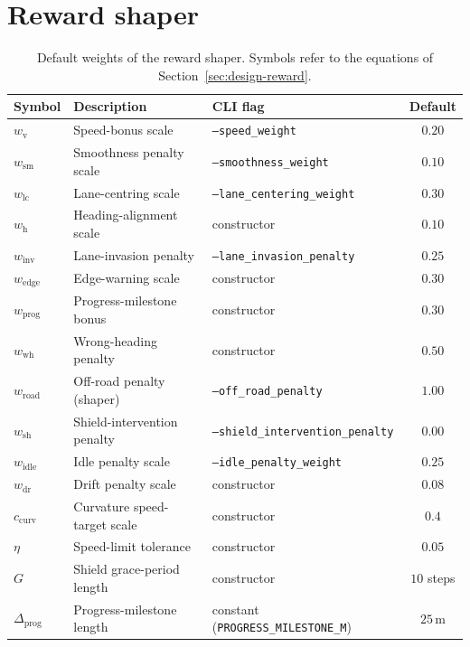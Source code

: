 \section{Reward shaper}\label{app:hp-reward}

\begin{table}[H]
  \centering
  \caption{Default weights of the reward shaper. Symbols refer to the equations of
           Section~\ref{sec:design-reward}.}
  \label{tab:hp-reward}
  \small
  \begin{tabular}{@{}lllc@{}}
    \toprule
    \textbf{Symbol} & \textbf{Description} & \textbf{CLI flag} & \textbf{Default} \\
    \midrule
    \(w_{\mathrm{v}}\)       & Speed-bonus scale           & \texttt{--speed\_weight}               & \(0.20\) \\
    \(w_{\mathrm{sm}}\)      & Smoothness penalty scale    & \texttt{--smoothness\_weight}          & \(0.10\) \\
    \(w_{\mathrm{lc}}\)      & Lane-centring scale         & \texttt{--lane\_centering\_weight}     & \(0.30\) \\
    \(w_{\mathrm{h}}\)       & Heading-alignment scale     & constructor                            & \(0.10\) \\
    \(w_{\mathrm{inv}}\)     & Lane-invasion penalty       & \texttt{--lane\_invasion\_penalty}     & \(0.25\) \\
    \(w_{\mathrm{edge}}\)    & Edge-warning scale          & constructor                            & \(0.30\) \\
    \(w_{\mathrm{prog}}\)    & Progress-milestone bonus    & constructor                            & \(0.30\) \\
    \(w_{\mathrm{wh}}\)      & Wrong-heading penalty       & constructor                            & \(0.50\) \\
    \(w_{\mathrm{road}}\)    & Off-road penalty (shaper)   & \texttt{--off\_road\_penalty}          & \(1.00\) \\
    \(w_{\mathrm{sh}}\)      & Shield-intervention penalty & \texttt{--shield\_intervention\_penalty}& \(0.00\) \\
    \(w_{\mathrm{idle}}\)    & Idle penalty scale          & \texttt{--idle\_penalty\_weight}       & \(0.25\) \\
    \(w_{\mathrm{dr}}\)      & Drift penalty scale         & constructor                            & \(0.08\) \\
    \(c_{\mathrm{curv}}\)    & Curvature speed-target scale & constructor                           & \(0.4\) \\
    \(\eta\)                 & Speed-limit tolerance       & constructor                            & \(0.05\) \\
    \(G\)                    & Shield grace-period length  & constructor                            & \(10\) steps \\
    \(\Delta_{\mathrm{prog}}\)& Progress-milestone length  & constant (\texttt{PROGRESS\_MILESTONE\_M}) & \(25\,\mathrm{m}\) \\
    \bottomrule
  \end{tabular}
\end{table}

